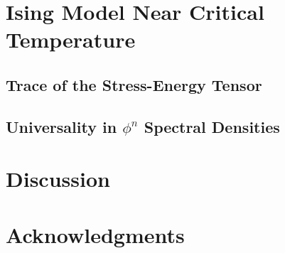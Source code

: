 


\section{Ising Model Near Critical Temperature}
\label{sec:Ising}




\subsection{Trace of the Stress-Energy Tensor}
\label{subsec:stress}




\subsection{Universality in $\phi^n$ Spectral Densities}








\section{Discussion}
\label{sec:Discussion}


 


\section*{Acknowledgments}    







